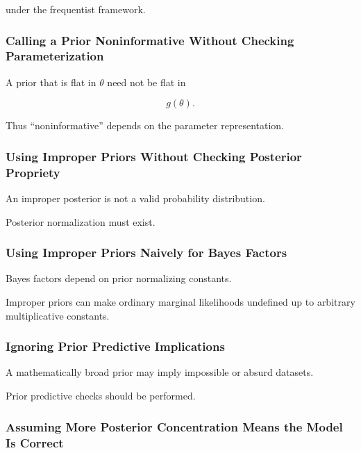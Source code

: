 under the frequentist framework.

\subsubsection{Calling a Prior Noninformative Without Checking Parameterization}

A prior that is flat in \(\theta\) need not be flat in

\[
g(\theta).
\]

Thus ``noninformative'' depends on the parameter representation.

\subsubsection{Using Improper Priors Without Checking Posterior Propriety}

An improper posterior is not a valid probability distribution.

Posterior normalization must exist.

\subsubsection{Using Improper Priors Naively for Bayes Factors}

Bayes factors depend on prior normalizing constants.

Improper priors can make ordinary marginal likelihoods undefined up to
arbitrary multiplicative constants.

\subsubsection{Ignoring Prior Predictive Implications}

A mathematically broad prior may imply impossible or absurd datasets.

Prior predictive checks should be performed.

\subsubsection{Assuming More Posterior Concentration Means the Model Is Correct}


